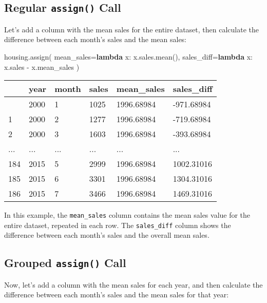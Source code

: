 \documentclass[
  letterpaper,
  DIV=11,
  numbers=noendperiod]{scrreprt}
\newenvironment{Shaded}{\begin{snugshade}}{\end{snugshade}}
\newcommand{\KeywordTok}[1]{\textcolor[rgb]{0.00,0.23,0.31}{\textbf{#1}}}
\newcommand{\NormalTok}[1]{\textcolor[rgb]{0.00,0.23,0.31}{#1}}
\newcommand{\OperatorTok}[1]{\textcolor[rgb]{0.37,0.37,0.37}{#1}}
\begin{document}
\subsection{\texorpdfstring{Regular \texttt{assign()}
Call}{Regular assign() Call}}\label{regular-assign-call-1}

Let's add a column with the mean sales for the entire dataset, then
calculate the difference between each month's sales and the mean sales:

\begin{Shaded}
\begin{Highlighting}[]
\NormalTok{housing.assign(}
\NormalTok{    mean\_sales}\OperatorTok{=}\KeywordTok{lambda}\NormalTok{ x: x.sales.mean(), }
\NormalTok{    sales\_diff}\OperatorTok{=}\KeywordTok{lambda}\NormalTok{ x: x.sales }\OperatorTok{{-}}\NormalTok{ x.mean\_sales}
\NormalTok{)}
\end{Highlighting}
\end{Shaded}

\begin{longtable}[]{@{}llllll@{}}
\toprule\noalign{}
& year & month & sales & mean\_sales & sales\_diff \\
\midrule\noalign{}
\endhead
\bottomrule\noalign{}
\endlastfoot
0 & 2000 & 1 & 1025 & 1996.68984 & -971.68984 \\
1 & 2000 & 2 & 1277 & 1996.68984 & -719.68984 \\
2 & 2000 & 3 & 1603 & 1996.68984 & -393.68984 \\
... & ... & ... & ... & ... & ... \\
184 & 2015 & 5 & 2999 & 1996.68984 & 1002.31016 \\
185 & 2015 & 6 & 3301 & 1996.68984 & 1304.31016 \\
186 & 2015 & 7 & 3466 & 1996.68984 & 1469.31016 \\
\end{longtable}

In this example, the \texttt{mean\_sales} column contains the mean sales
value for the entire dataset, repeated in each row. The
\texttt{sales\_diff} column shows the difference between each month's
sales and the overall mean sales.

\subsection{\texorpdfstring{Grouped \texttt{assign()}
Call}{Grouped assign() Call}}\label{grouped-assign-call-1}

Now, let's add a column with the mean sales for each year, and then
calculate the difference between each month's sales and the mean sales
for that year:
\end{document}

